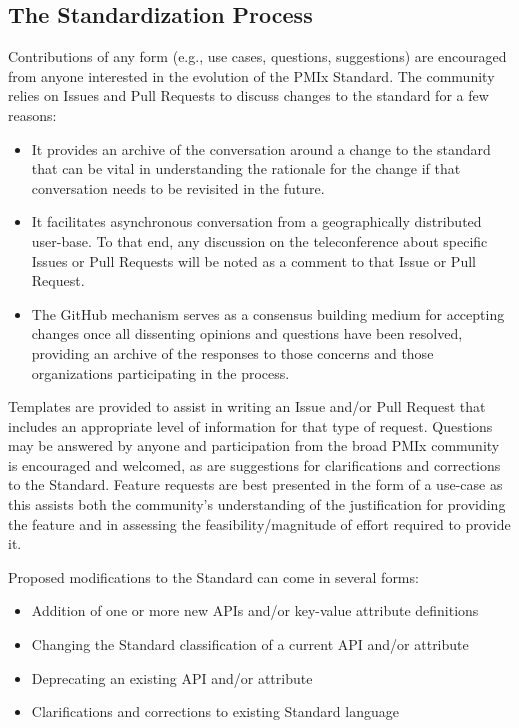 \documentclass{article}
\begin{document}
\hypertarget{the-standardization-process}{%
\subsection{The Standardization
Process}\label{the-standardization-process}}

Contributions of any form (e.g., use cases, questions, suggestions) are
encouraged from anyone interested in the evolution of the PMIx Standard.
The community relies on Issues and Pull Requests to discuss changes to
the standard for a few reasons:

\begin{itemize}
\item
  It provides an archive of the conversation around a change to the
  standard that can be vital in understanding the rationale for the
  change if that conversation needs to be revisited in the future.
\item
  It facilitates asynchronous conversation from a geographically
  distributed user-base. To that end, any discussion on the
  teleconference about specific Issues or Pull Requests will be noted as
  a comment to that Issue or Pull Request.
\item
  The GitHub mechanism serves as a consensus building medium for
  accepting changes once all dissenting opinions and questions have been
  resolved, providing an archive of the responses to those concerns and
  those organizations participating in the process.
\end{itemize}

Templates are provided to assist in writing an Issue and/or Pull Request
that includes an appropriate level of information for that type of
request. Questions may be answered by anyone and participation from the
broad PMIx community is encouraged and welcomed, as are suggestions for
clarifications and corrections to the Standard. Feature requests are
best presented in the form of a use-case as this assists both the
community's understanding of the justification for providing the feature
and in assessing the feasibility/magnitude of effort required to provide
it.

Proposed modifications to the Standard can come in several forms:

\begin{itemize}
\item
  Addition of one or more new APIs and/or key-value attribute
  definitions
\item
  Changing the Standard classification of a current API and/or attribute
\item
  Deprecating an existing API and/or attribute
\item
  Clarifications and corrections to existing Standard language
\end{itemize}
\end{document}
